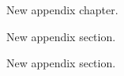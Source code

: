 \begin{justify}
     New appendix chapter.
\end{justify}

\begin{justify}
     New appendix section.
\end{justify}

\begin{justify}
     New appendix section.
\end{justify}
